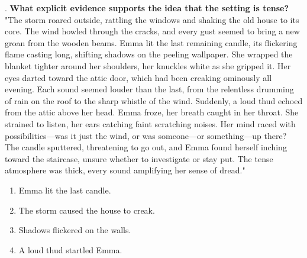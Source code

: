 \documentclass[12pt]{article}
\begin{document}
\vspace{1cm}
. \textbf{What explicit evidence supports the idea that the setting is tense?\\}
"The storm roared outside, rattling the windows and shaking the old house to its core. The wind howled through the cracks, and every gust seemed to bring a new groan from the wooden beams. Emma lit the last remaining candle, its flickering flame casting long, shifting shadows on the peeling wallpaper. She wrapped the blanket tighter around her shoulders, her knuckles white as she gripped it. Her eyes darted toward the attic door, which had been creaking ominously all evening. Each sound seemed louder than the last, from the relentless drumming of rain on the roof to the sharp whistle of the wind. Suddenly, a loud thud echoed from the attic above her head. Emma froze, her breath caught in her throat. She strained to listen, her ears catching faint scratching noises. Her mind raced with possibilities—was it just the wind, or was someone—or something—up there? The candle sputtered, threatening to go out, and Emma found herself inching toward the staircase, unsure whether to investigate or stay put. The tense atmosphere was thick, every sound amplifying her sense of dread."  
\begin{enumerate}[label=\Alph*.]
    \item Emma lit the last candle.  
    \item The storm caused the house to creak.  
    \item Shadows flickered on the walls.  
    \item A loud thud startled Emma.  
\end{enumerate}

\vspace{1em}
\end{document}
